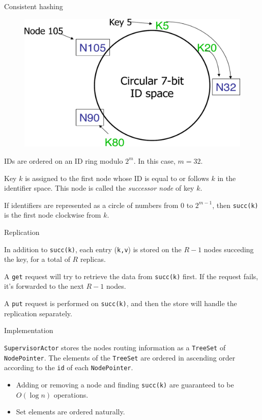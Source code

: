 \documentclass{beamer}
\begin{document}
\begin{frame}{Consistent hashing} \justify

    \begin{figure}
        \includegraphics[width=0.5\linewidth]{00-ConsistentHashing.png}
    \end{figure}
    
    IDs are ordered on an ID ring modulo $2^m$. In this case, $m=32$.
        
    Key $k$ is assigned to the first node whose ID is equal to or follows $k$ in the identifier space. This node is called the \textit{successor node} of key $k$. 
    
    If identifiers are represented as a circle of numbers from $0$ to $2^{m - 1}$, then \texttt{succ(k)} is the first node clockwise from $k$. 

\end{frame}

\begin{frame}{Replication} \justify

    In addition to \texttt{succ(k)}, each entry (\texttt{k,v}) is stored on the $R-1$ nodes succeding the key, for a total of $R$ replicas. 

    A \texttt{get} request will try to retrieve the data from \texttt{succ(k)} first. If the request fails, it's forwarded to the next $R-1$ nodes.

    A \texttt{put} request is performed on \texttt{succ(k)}, and then the store will handle the replication separately.

\end{frame}

\begin{frame}{Implementation} \justify
    
    \texttt{SupervisorActor} stores the nodes routing information as a \texttt{TreeSet} of \texttt{NodePointer}. The elements of the \texttt{TreeSet} are ordered in ascending order according to the \texttt{id} of each \texttt{NodePointer}.

    \begin{itemize}[label=$\bullet$]
        \item Adding or removing a node and finding \texttt{succ(k)} are guaranteed to be $O(\log n)$ operations.
        \item Set elements are ordered naturally.
    \end{itemize}

\end{frame}
\end{document}
